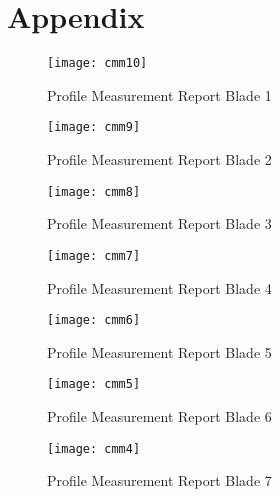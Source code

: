 
%

\chapter{Appendix}
\label{app:appendix}

\begin{figure}[H]
    \centering
    \texttt{[image: cmm10]}
    \caption{Profile Measurement Report Blade 1}
    \label{fig:cmm10}
\end{figure}

\begin{figure}[H]
    \centering
    \texttt{[image: cmm9]}
    \caption{Profile Measurement Report Blade 2}
    \label{fig:cmm9}
\end{figure}

\begin{figure}[H]
    \centering
    \texttt{[image: cmm8]}
    \caption{Profile Measurement Report Blade 3}
    \label{fig:cmm8}
\end{figure}

\begin{figure}[H]
    \centering
    \texttt{[image: cmm7]}
    \caption{Profile Measurement Report Blade 4}
    \label{fig:cmm7}
\end{figure}

\begin{figure}[H]
    \centering
    \texttt{[image: cmm6]}
    \caption{Profile Measurement Report Blade 5}
    \label{fig:cmm6}
\end{figure}

\begin{figure}[H]
    \centering
    \texttt{[image: cmm5]}
    \caption{Profile Measurement Report Blade 6}
    \label{fig:cmm5}
\end{figure}

\begin{figure}[H]
    \centering
    \texttt{[image: cmm4]}
    \caption{Profile Measurement Report Blade 7}
    \label{fig:cmm4}
\end{figure}

